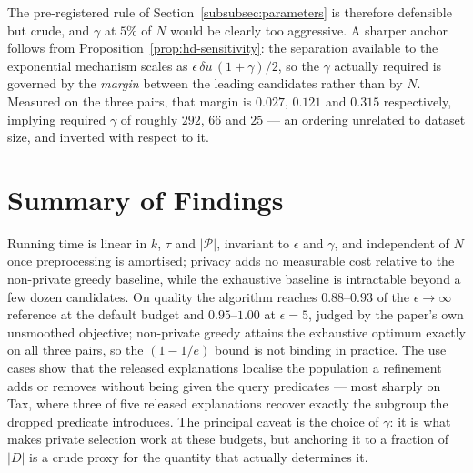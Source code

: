 The pre-registered rule of Section~\ref{subsubsec:parameters} is therefore defensible but crude, and $\gamma$ at $5\%$ of $N$ would be clearly too aggressive.
A sharper anchor follows from Proposition~\ref{prop:hd-sensitivity}: the separation available to the exponential mechanism scales as $\epsilon\,\delta u\,(1+\gamma)/2$, so the $\gamma$ actually required is governed by the \emph{margin} between the leading candidates rather than by $N$.
Measured on the three pairs, that margin is $0.027$, $0.121$ and $0.315$ respectively, implying required $\gamma$ of roughly $292$, $66$ and $25$ --- an ordering unrelated to dataset size, and inverted with respect to it.

\section{Summary of Findings}
\label{subsec:experiments-summary}

Running time is linear in $k$, $\tau$ and $|\mathcal{P}|$, invariant to $\epsilon$ and $\gamma$, and independent of $N$ once preprocessing is amortised; privacy adds no measurable cost relative to the non-private greedy baseline, while the exhaustive baseline is intractable beyond a few dozen candidates.
On quality the algorithm reaches $0.88$--$0.93$ of the $\epsilon\rightarrow\infty$ reference at the default budget and $0.95$--$1.00$ at $\epsilon=5$, judged by the paper's own unsmoothed objective; non-private greedy attains the exhaustive optimum exactly on all three pairs, so the $(1-1/e)$ bound is not binding in practice.
The use cases show that the released explanations localise the population a refinement adds or removes without being given the query predicates --- most sharply on Tax, where three of five released explanations recover exactly the subgroup the dropped predicate introduces.
The principal caveat is the choice of $\gamma$: it is what makes private selection work at these budgets, but anchoring it to a fraction of $|D|$ is a crude proxy for the quantity that actually determines it.
